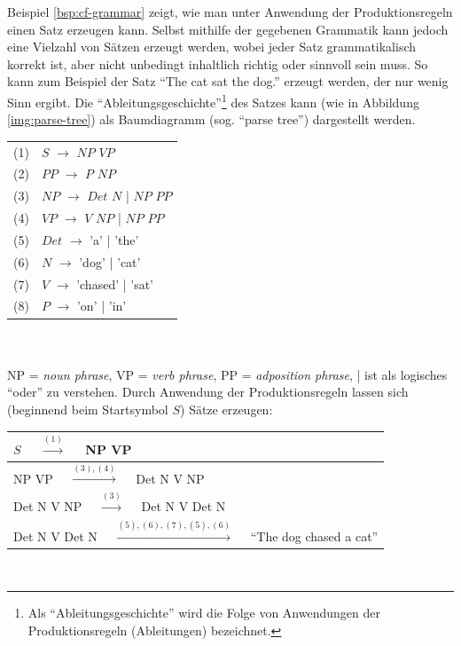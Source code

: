 \documentclass[
	a4paper,
	12pt,
	bibliography=totocnumbered,
	twoside,
]{scrreprt}
\begin{document}
Beispiel \ref{bsp:cf-grammar} zeigt, wie man unter Anwendung der Produktionsregeln einen Satz erzeugen kann. Selbst mithilfe der gegebenen Grammatik kann jedoch eine Vielzahl von Sätzen erzeugt werden, wobei jeder Satz grammatikalisch korrekt ist, aber nicht unbedingt inhaltlich richtig oder sinnvoll sein muss. So kann zum Beispiel der Satz "`The cat sat the dog."' erzeugt werden, der nur wenig Sinn ergibt. Die "`Ableitungsgeschichte"'\footnote{Als "`Ableitungsgeschichte"' wird die Folge von Anwendungen der Produktionsregeln (Ableitungen) bezeichnet.} des Satzes kann (wie in Abbildung \ref{img:parse-tree}) als Baumdiagramm (sog. "`parse tree"') dargestellt werden. \\
\bigskip

\begin{Beispiel}
    \label{bsp:cf-grammar}
    \begin{tabular}{| p{1cm} p{5cm} |}
    \hline
         (1) & $S$ $\rightarrow$ $NP$ $VP$ \\
         (2) & $PP$ $\rightarrow$ $P$ $NP$ \\
         (3) & $NP$ $\rightarrow$ $Det$ $N$ | $NP$ $PP$ \\
         (4) & $VP$ $\rightarrow$ $V$ $NP$ | $NP$ $PP$ \\
         (5) & $Det$ $\rightarrow$ 'a' | 'the' \\
         (6) & $N$ $\rightarrow$ 'dog' | 'cat' \\
         (7) & $V$ $\rightarrow$ 'chased' | 'sat' \\
         (8) & $P$ $\rightarrow$ 'on' | 'in'\\
         \hline
    \end{tabular}\\
    \smallskip \\
    NP = \textit{noun phrase}, VP = \textit{verb phrase}, PP = \textit{adposition phrase}, | ist als logisches "`oder"' zu verstehen.
    Durch Anwendung der Produktionsregeln lassen sich (beginnend beim Startsymbol $S$) Sätze erzeugen:\\
    
    \begin{tabular}{| p{12cm} |}
        \hline
        $S$ \ \ $\xrightarrow{(1)}$ \ \   NP VP\\ \hline
        NP VP \ \ $\xrightarrow{(3),(4)}$ \ \ Det N V NP \\ \hline
        Det N V NP \ \ $\xrightarrow{(3)}$ \ \ Det N V Det N \\ \hline
        Det N V Det N \ \ $\xrightarrow{(5), (6), (7), (5), (6)}$ \ \ "`The dog chased a cat"' \\
        \hline
    \end{tabular}\\
    \smallskip
\end{Beispiel}
\bigskip
\end{document}
